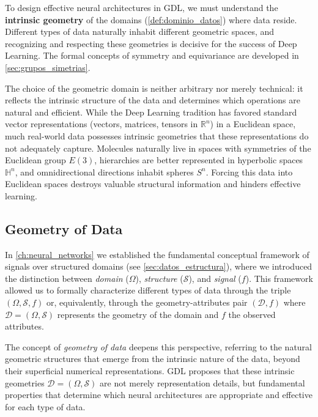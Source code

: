 To design effective neural architectures in \gls{GDL}, we must understand the \textbf{intrinsic geometry} of the domains (\autoref{def:dominio_datos}) where data reside. Different types of data naturally inhabit different geometric spaces, and recognizing and respecting these geometries is decisive for the success of Deep Learning. The formal concepts of symmetry and equivariance are developed in \autoref{sec:grupos_simetrias}.

The choice of the geometric domain is neither arbitrary nor merely technical: it reflects the intrinsic structure of the data and determines which operations are natural and efficient. While the Deep Learning tradition has favored standard vector representations (vectors, matrices, tensors in $\mathbb{R}^n$) in a Euclidean space, much real-world data possesses intrinsic geometries that these representations do not adequately capture. Molecules naturally live in spaces with symmetries of the Euclidean group $E(3)$, hierarchies are better represented in hyperbolic spaces $\mathbb{H}^n$, and omnidirectional directions inhabit spheres $S^n$. Forcing this data into Euclidean spaces destroys valuable structural information and hinders effective learning.

\subsection{Geometry of Data}\label{subsec:geometria_datos}

In \autoref{ch:neural_networks} we established the fundamental conceptual framework of signals over structured domains (see \autoref{sec:datos_estructura}), where we introduced the distinction between \textit{domain} ($\Omega$), \textit{structure} ($\mathcal{S}$), and \textit{signal} ($f$). This framework allowed us to formally characterize different types of data through the triple $(\Omega, \mathcal{S}, f)$ or, equivalently, through the geometry-attributes pair $(\mathcal{D}, f)$ where $\mathcal{D} = (\Omega, \mathcal{S})$ represents the geometry of the domain and $f$ the observed attributes.

The concept of \textit{geometry of data} deepens this perspective, referring to the natural geometric structures that emerge from the intrinsic nature of the data, beyond their superficial numerical representations. \gls{GDL} proposes that these intrinsic geometries $\mathcal{D} = (\Omega, \mathcal{S})$ are not merely representation details, but fundamental properties that determine which neural architectures are appropriate and effective for each type of data.


